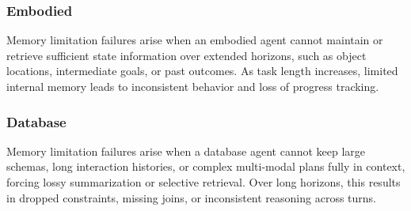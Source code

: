 \documentclass[11pt]{article}
\begin{document}
\subsubsection{Embodied}
Memory limitation failures arise when an embodied agent cannot maintain or retrieve sufficient state information over extended horizons, such as object locations, intermediate goals, or past outcomes. As task length increases, limited internal memory leads to inconsistent behavior and loss of progress tracking.

\subsubsection{Database}
Memory limitation failures arise when a database agent cannot keep large schemas, long interaction histories, or complex multi-modal plans fully in context, forcing lossy summarization or selective retrieval. Over long horizons, this results in dropped constraints, missing joins, or inconsistent reasoning across turns.






\end{document}

